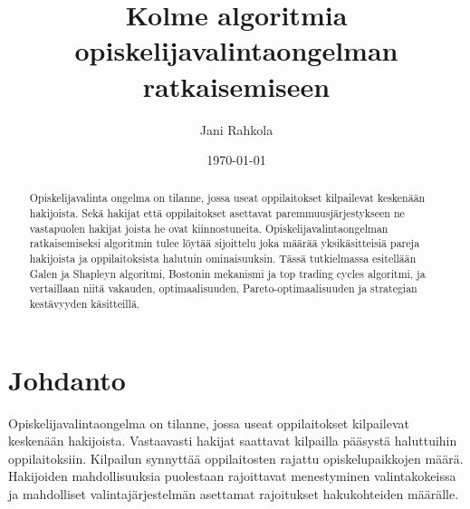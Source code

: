 \documentclass[gradu, twoside]{tktltiki}
\begin{document}
\title{Kolme algoritmia opiskelijavalintaongelman ratkaisemiseen}
\author{Jani Rahkola}
\date{\today}



\maketitle

\doublespacing

\subject{Tietojenkäsittelytiede}

\def\hyph{-\penalty0\hskip0pt\relax}
\hyphenation{}

\begin{abstract}
Opiskelijavalinta ongelma on tilanne, jossa useat oppilaitokset
kilpailevat keskenään hakijoista. Sekä hakijat että oppilaitokset
asettavat paremmuusjärjestykseen ne vastapuolen hakijat joista he ovat
kiinnostuneita. Opiskelijavalintaongelman ratkaisemiseksi algoritmin
tulee löytää sijoittelu joka määrää yksikäsitteisiä pareja hakijoista
ja oppilaitoksista halutuin ominaisuuksin. Tässä tutkielmassa
esitellään Galen ja Shapleyn algoritmi, Bostonin mekanismi ja top
trading cycles algoritmi, ja vertaillaan niitä vakauden,
optimaalisuuden, Pareto\hyph optimaalisuuden ja strategian kestävyyden
käsitteillä.
\end{abstract}

\mytableofcontents

\section{Johdanto}

Opiskelijavalintaongelma on tilanne, jossa useat oppilaitokset
kilpailevat keskenään hakijoista. Vastaavasti hakijat saattavat
kilpailla pääsystä haluttuihin oppilaitoksiin. Kilpailun synnyttää
oppilaitosten rajattu opiskelupaikkojen määrä. Hakijoiden
mahdollisuuksia puolestaan rajoittavat menestyminen valintakokeissa ja
mahdolliset valintajärjestelmän asettamat rajoitukset hakukohteiden
määrälle.
\end{document}
